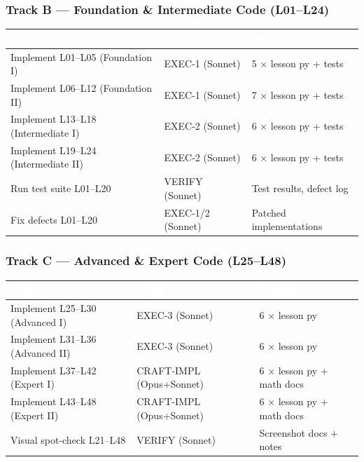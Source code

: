 \documentclass[11pt,letterpaper]{article}
\newcommand{\tableheader}[1]{\textbf{\sffamily\textcolor{white}{#1}}}
\begin{document}
\subsubsection{Track B --- Foundation \& Intermediate Code (L01--L24)}

\begin{center}
\begin{tabularx}{\textwidth}{L{4cm}L{3cm}X}
\toprule
{}
\tableheader{Task} & \tableheader{Agent} & \tableheader{Output} \\
\midrule
Implement L01--L05 (Foundation I) & EXEC-1 (Sonnet) & 5 × lesson py + tests \\
Implement L06--L12 (Foundation II) & EXEC-1 (Sonnet) & 7 × lesson py + tests \\
Implement L13--L18 (Intermediate I) & EXEC-2 (Sonnet) & 6 × lesson py + tests \\
Implement L19--L24 (Intermediate II) & EXEC-2 (Sonnet) & 6 × lesson py + tests \\
Run test suite L01--L20 & VERIFY (Sonnet) & Test results, defect log \\
Fix defects L01--L20 & EXEC-1/2 (Sonnet) & Patched implementations \\
\bottomrule
\end{tabularx}
\end{center}

\subsubsection{Track C --- Advanced \& Expert Code (L25--L48)}

\begin{center}
\begin{tabularx}{\textwidth}{L{4cm}L{3cm}X}
\toprule
{}
\tableheader{Task} & \tableheader{Agent} & \tableheader{Output} \\
\midrule
Implement L25--L30 (Advanced I) & EXEC-3 (Sonnet) & 6 × lesson py \\
Implement L31--L36 (Advanced II) & EXEC-3 (Sonnet) & 6 × lesson py \\
Implement L37--L42 (Expert I) & CRAFT-IMPL (Opus+Sonnet) & 6 × lesson py + math docs \\
Implement L43--L48 (Expert II) & CRAFT-IMPL (Opus+Sonnet) & 6 × lesson py + math docs \\
Visual spot-check L21--L48 & VERIFY (Sonnet) & Screenshot docs + notes \\
\bottomrule
\end{tabularx}
\end{center}
\end{document}
